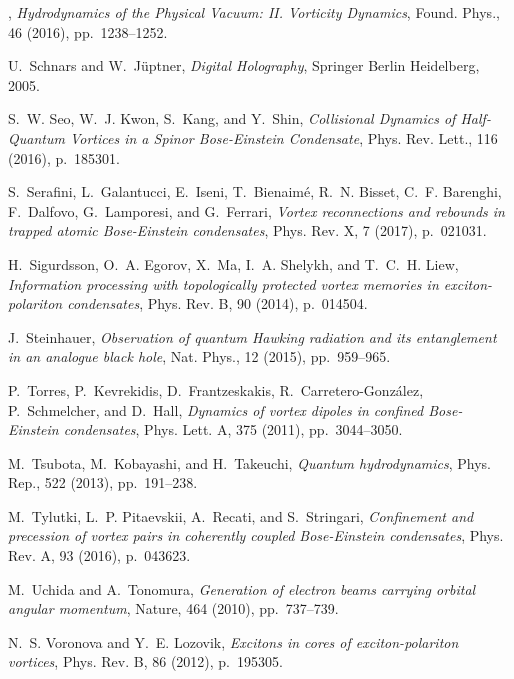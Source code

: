 \documentclass[aps,prb,twocolumn,superscriptaddress,nofootinbib]{revtex4}
\begin{document}
\begin{thebibliography}{10}
\leavevmode\vrule height 2pt depth -1.6pt width 23pt, {\em Hydrodynamics of the
  {Physical} {Vacuum}: {II}. {Vorticity} {Dynamics}}, Found. Phys., 46 (2016),
  pp.~1238--1252.

{\sc U.~Schnars and W.~J\"{u}ptner}, {\em {Digital Holography}}, Springer
  Berlin Heidelberg, 2005.

{\sc S.~W. Seo, W.~J. Kwon, S.~Kang, and Y.~Shin}, {\em Collisional {Dynamics}
  of {Half}-{Quantum} {Vortices} in a {Spinor} {Bose}-{Einstein} {Condensate}},
  Phys. Rev. Lett., 116 (2016), p.~185301.

{\sc S.~Serafini, L.~Galantucci, E.~Iseni, T.~Bienaim\'e, R.~N. Bisset, C.~F.
  Barenghi, F.~Dalfovo, G.~Lamporesi, and G.~Ferrari}, {\em Vortex
  reconnections and rebounds in trapped atomic {Bose-Einstein} condensates},
  Phys. Rev. X, 7 (2017), p.~021031.

{\sc H.~Sigurdsson, O.~A. Egorov, X.~Ma, I.~A. Shelykh, and T.~C.~H. Liew},
  {\em Information processing with topologically protected vortex memories in
  exciton-polariton condensates}, Phys. Rev. B, 90 (2014), p.~014504.

{\sc J.~Steinhauer}, {\em Observation of quantum {Hawking} radiation and its
  entanglement in an analogue black hole}, Nat. Phys., 12 (2015), pp.~959--965.

{\sc P.~Torres, P.~Kevrekidis, D.~Frantzeskakis, R.~Carretero-Gonz{\'a}lez,
  P.~Schmelcher, and D.~Hall}, {\em Dynamics of vortex dipoles in confined
  {Bose}-{Einstein} condensates}, Phys. Lett. A, 375 (2011), pp.~3044--3050.

{\sc M.~Tsubota, M.~Kobayashi, and H.~Takeuchi}, {\em Quantum hydrodynamics},
  Phys. Rep., 522 (2013), pp.~191--238.

{\sc M.~Tylutki, L.~P. Pitaevskii, A.~Recati, and S.~Stringari}, {\em
  Confinement and precession of vortex pairs in coherently coupled
  {Bose}-{Einstein} condensates}, Phys. Rev. A, 93 (2016), p.~043623.

{\sc M.~Uchida and A.~Tonomura}, {\em Generation of electron beams carrying
  orbital angular momentum}, Nature, 464 (2010), pp.~737--739.

{\sc N.~S. Voronova and Y.~E. Lozovik}, {\em Excitons in cores of
  exciton-polariton vortices}, Phys. Rev. B, 86 (2012), p.~195305.


\end{thebibliography}
\end{document}
